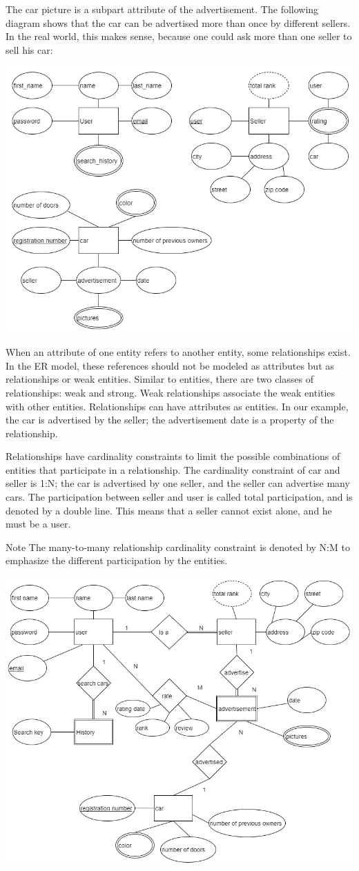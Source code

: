 \documentclass[]{book}
\begin{document}
The car picture is a subpart attribute of the advertisement. The following diagram shows that the car can be advertised more than once by different sellers. In the real world, this makes sense, because one could ask more than one seller to sell his car:

\begin{center}\includegraphics[width=0.7\linewidth]{img/01/db_model2} \end{center}

When an attribute of one entity refers to another entity, some relationships exist. In the ER model, these references should not be modeled as attributes but as relationships or weak entities. Similar to entities, there are two classes of relationships: weak and strong. Weak relationships associate the weak entities with other entities. Relationships can have attributes as entities. In our example, the car is advertised by the seller; the advertisement date is a property of the relationship.

Relationships have cardinality constraints to limit the possible combinations of entities that participate in a relationship. The cardinality constraint of car and seller is 1:N; the car is advertised by one seller, and the seller can advertise many cars. The participation between seller and user is called total participation, and is denoted by a double line. This means that a seller cannot exist alone, and he must be a user.

Note
The many-to-many relationship cardinality constraint is denoted by N:M to emphasize the different participation by the entities.

\begin{center}\includegraphics[width=0.7\linewidth]{img/01/db_model3} \end{center}
\end{document}
